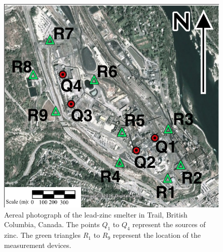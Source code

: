 \documentclass[12pt]{book}
\begin{document}
\begin{figure}[H]
\centering
\includegraphics[scale=0.35]{FigChap4/AerealView}
\caption{Aereal photograph of the lead-zinc smelter in Trail, British Columbia, Canada. The points
$Q_{1}$ to $Q_{4}$ represent the sources of zinc. The green triangles $R_{1}$ to $R_{9}$ represent
the location of the measurement devices.}
\label{figAereal}
\end{figure}

\end{document}

